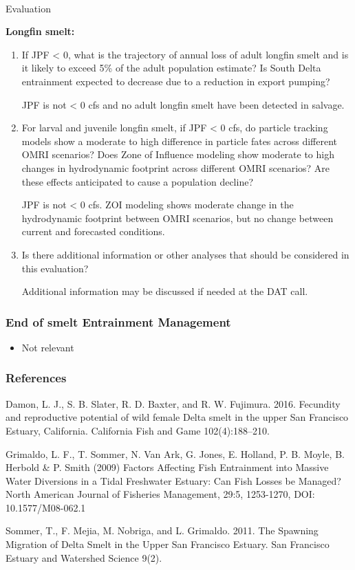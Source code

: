 \documentclass[
  letterpaper,
  DIV=11,
  numbers=noendperiod]{scrartcl}
\makeatletter
\let\oldparagraph\paragraph
\renewcommand{\paragraph}{
    \@ifstar
      \xxxParagraphStar
      \xxxParagraphNoStar
  }
\newcommand{\xxxParagraphStar}[1]{\oldparagraph*{#1}\mbox{}}
\newcommand{\xxxParagraphNoStar}[1]{\oldparagraph{#1}\mbox{}}
\providecommand{\tightlist}{%
  \setlength{\itemsep}{0pt}\setlength{\parskip}{0pt}}
\makeatother
\begin{document}
\paragraph{Evaluation}\label{evaluation-1}

\textbf{Longfin smelt:}

\begin{enumerate}
\def\labelenumi{\arabic{enumi}.}
\item
  If JPF \textless{} 0, what is the trajectory of annual loss of adult
  longfin smelt and is it likely to exceed 5\% of the adult population
  estimate? Is South Delta entrainment expected to decrease due to a
  reduction in export pumping?

  JPF is not \textless{} 0 cfs and no adult longfin smelt have been
  detected in salvage.
\item
  For larval and juvenile longfin smelt, if JPF \textless{} 0 cfs, do
  particle tracking models show a moderate to high difference in
  particle fates across different OMRI scenarios? Does Zone of Influence
  modeling show moderate to high changes in hydrodynamic footprint
  across different OMRI scenarios? Are these effects anticipated to
  cause a population decline?

  JPF is not \textless{} 0 cfs. ZOI modeling shows moderate change in
  the hydrodynamic footprint between OMRI scenarios, but no change
  between current and forecasted conditions.
\item
  Is there additional information or other analyses that should be
  considered in this evaluation?

  Additional information may be discussed if needed at the DAT call.
\end{enumerate}

\subsubsection{End of smelt Entrainment
Management}\label{end-of-smelt-entrainment-management}

\begin{itemize}
\tightlist
\item
  Not relevant
\end{itemize}

\subsubsection{References}\label{references}

Damon, L. J., S. B. Slater, R. D. Baxter, and R. W. Fujimura. 2016.
Fecundity and reproductive potential of wild female Delta smelt in the
upper San Francisco Estuary, California. California Fish and Game
102(4):188--210.

Grimaldo, L. F., T. Sommer, N. Van Ark, G. Jones, E. Holland, P. B.
Moyle, B. Herbold \& P. Smith (2009) Factors Affecting Fish Entrainment
into Massive Water Diversions in a Tidal Freshwater Estuary: Can Fish
Losses be Managed? North American Journal of Fisheries Management, 29:5,
1253-1270, DOI: 10.1577/M08-062.1

Sommer, T., F. Mejia, M. Nobriga, and L. Grimaldo. 2011. The Spawning
Migration of Delta Smelt in the Upper San Francisco Estuary. San
Francisco Estuary and Watershed Science 9(2).
\end{document}
